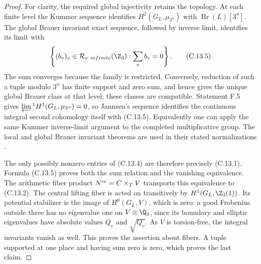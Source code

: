 \begin{proof}
For clarity, the required global injectivity retains
the topology. At each finite level the Kummer sequence
identifies $H^2(G_L,\mu_{3^n})$ with $\operatorname{Br}(L)[3^n]$.
The global Brauer invariant exact sequence, followed
by inverse limit, identifies its limit with
\[
 \left\{(b_v)_v\in\mathcal R_{v\ {
m finite}}(\Z_3):
                       \sum_v b_v=0\right\}.
 \tag{C.13.5}
\]
The sum converges because the family is restricted.
Conversely, reduction of such a tuple modulo $3^n$
has finite support and zero sum, and hence gives the
unique global Brauer class at that level; these
classes are compatible. Statement F.5 gives
$\varprojlim{}^1 H^1(G_L,\mu_{3^n})=0$, so Jannsen's
sequence identifies the continuous integral second
cohomology itself with (C.13.5). Equivalently one can
apply the same Kummer inverse-limit argument to the
completed multiplicative group. The local and global
Brauer invariant theorems are used in their stated
normalizations \cite{MilneCFT}.

The only possibly nonzero entries of (C.13.4) are
therefore precisely (C.13.1). Formula (C.13.5) proves
both the sum relation and the vanishing equivalence.
The arithmetic fiber product
$N^{\rm cc}=C\times_TV$ transports this equivalence
to (C.13.2). The central lifting fiber is acted on
transitively by $H^1(G_L,\Z_3(1))$. Its potential
stabilizer is the image of $H^0(G_L,V)$, which is
zero: a good Frobenius outside three has no eigenvalue
one on $V\otimes\Q_3$, since its boundary and elliptic
eigenvalues have absolute values $Q_v$ and
$\sqrt{Q_v}$. As $V$ is torsion-free, the integral
invariants vanish as well. This proves the assertion
about fibers. A tuple supported at one place and
having sum zero is zero, which proves the last claim.
\end{proof}

